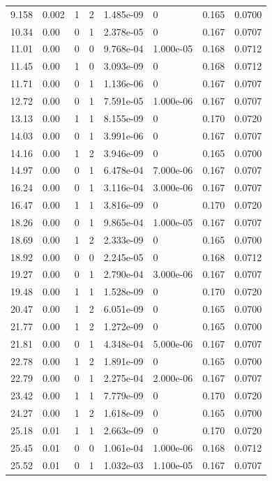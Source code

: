 \documentclass[preview]{standalone}
\begin{document}
{{\begin{tabular}{L{1.2cm}C{1.2cm} C{0.3cm}C{0.5cm} C{1.4cm}C{1.4cm} C{1.4cm}C{1.4cm}}
  9.158  &  0.002  & 1     &  2 &  1.485e-09  & 0  & 0.165 &  0.0700   \\ 
  10.34  &  0.00  & 0     &  1 &  2.378e-05  & 0  & 0.167 &  0.0707   \\ 
  11.01  &  0.00  & 0     &  0 &  9.768e-04  & 1.000e-05  & 0.168 &  0.0712   \\ 
  11.45  &  0.00  & 1     &  0 &  3.093e-09  & 0  & 0.168 &  0.0712   \\ 
  11.71  &  0.00  & 0     &  1 &  1.136e-06  & 0  & 0.167 &  0.0707   \\ 
  12.72  &  0.00  & 0     &  1 &  7.591e-05  & 1.000e-06  & 0.167 &  0.0707   \\ 
  13.13  &  0.00  & 1     &  1 &  8.155e-09  & 0  & 0.170 &  0.0720   \\ 
  14.03  &  0.00  & 0     &  1 &  3.991e-06  & 0  & 0.167 &  0.0707   \\ 
  14.16  &  0.00  & 1     &  2 &  3.946e-09  & 0  & 0.165 &  0.0700   \\ 
  14.97  &  0.00  & 0     &  1 &  6.478e-04  & 7.000e-06  & 0.167 &  0.0707   \\ 
  16.24  &  0.00  & 0     &  1 &  3.116e-04  & 3.000e-06  & 0.167 &  0.0707   \\ 
  16.47  &  0.00  & 1     &  1 &  3.816e-09  & 0  & 0.170 &  0.0720   \\ 
  18.26  &  0.00  & 0     &  1 &  9.865e-04  & 1.000e-05  & 0.167 &  0.0707   \\ 
  18.69  &  0.00  & 1     &  2 &  2.333e-09  & 0  & 0.165 &  0.0700   \\ 
  18.92  &  0.00  & 0     &  0 &  2.245e-05  & 0  & 0.168 &  0.0712   \\ 
  19.27  &  0.00  & 0     &  1 &  2.790e-04  & 3.000e-06  & 0.167 &  0.0707   \\ 
  19.48  &  0.00  & 1     &  1 &  1.528e-09  & 0  & 0.170 &  0.0720   \\ 
  20.47  &  0.00  & 1     &  2 &  6.051e-09  & 0  & 0.165 &  0.0700   \\ 
  21.77  &  0.00  & 1     &  2 &  1.272e-09  & 0  & 0.165 &  0.0700   \\ 
  21.81  &  0.00  & 0     &  1 &  4.348e-04  & 5.000e-06  & 0.167 &  0.0707   \\ 
  22.78  &  0.00  & 1     &  2 &  1.891e-09  & 0  & 0.165 &  0.0700   \\ 
  22.79  &  0.00  & 0     &  1 &  2.275e-04  & 2.000e-06  & 0.167 &  0.0707   \\ 
  23.42  &  0.00  & 1     &  1 &  7.779e-09  & 0  & 0.170 &  0.0720   \\ 
  24.27  &  0.00  & 1     &  2 &  1.618e-09  & 0  & 0.165 &  0.0700   \\ 
  25.18  &  0.01  & 1     &  1 &  2.663e-09  & 0  & 0.170 &  0.0720   \\ 
  25.45  &  0.01  & 0     &  0 &  1.061e-04  & 1.000e-06  & 0.168 &  0.0712   \\ 
  25.52  &  0.01  & 0     &  1 &  1.032e-03  & 1.100e-05  & 0.167 &  0.0707   \\ 
\hline 
\end{tabular} 

}}
\end{document}
